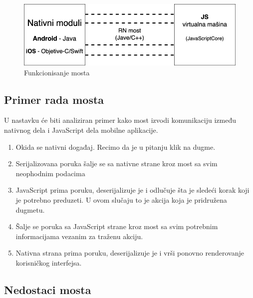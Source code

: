 \documentclass[12pt,oneside]{memoir}
\begin{document}
\begin{figure}[h]
    \centering
    \includegraphics[scale=0.5]{docs/images/chapterThree/reactNativeBridge.png}
    \caption{Funkcionisanje mosta}
    \label{fig:reactNativeBridge}
\end{figure}

\subsection{Primer rada mosta}

U nastavku će biti analiziran primer kako most izvodi komunikaciju između nativnog dela i JavaScript dela mobilne aplikacije.

\begin{enumerate}
    \item Okida se nativni događaj. Recimo da je u pitanju klik na dugme.
    \item Serijalizovana poruka šalje se sa nativne strane kroz most sa svim neophodnim podacima
    \item JavaScript prima poruku, deserijalizuje je i odlučuje šta je sledeći korak koji je potrebno preduzeti. U ovom slučaju to je akcija koja je pridružena dugmetu.
    \item Šalje se poruka sa JavaScript strane kroz most sa svim potrebnim informacijama vezanim za traženu akciju.
    \item Nativna strana prima poruku, deserijalizuje je i vrši ponovno renderovanje korisničkog interfejsa.
\end{enumerate}

\subsection{Nedostaci mosta}
\end{document}
